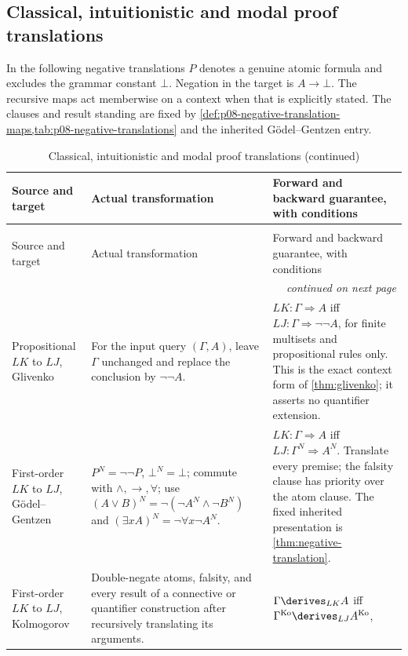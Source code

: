 \subsection{Classical, intuitionistic and modal proof translations}

In the following negative translations \(P\) denotes a genuine atomic
formula and excludes the grammar constant \(\bot\). Negation in the
target is \(A\to\bot\). The recursive maps act memberwise on a context
when that is explicitly stated. The clauses and result standing are fixed
by \cref{def:p08-negative-translation-maps,tab:p08-negative-translations}
and the inherited G\"odel--Gentzen entry.

\begin{longtable}{@{}p{}p{}p{}@{}}
\caption{Classical, intuitionistic and modal proof translations}\\
\toprule
Source and target & Actual transformation & Forward and backward guarantee, with conditions \\
\midrule
\endfirsthead
\caption[]{Classical, intuitionistic and modal proof translations (continued)}\\
\toprule
Source and target & Actual transformation & Forward and backward guarantee, with conditions \\
\midrule
\endhead
\midrule\multicolumn{3}{r}{\emph{continued on next page}}\\
\endfoot
\endlastfoot
Propositional \(LK\) to \(LJ\), Glivenko &
For the input query \((\Gamma,A)\), leave \(\Gamma\) unchanged and
replace the conclusion by \(\neg\neg A\). &
\(LK:\Gamma\Rightarrow A\) iff \(LJ:\Gamma\Rightarrow\neg\neg A\),
for finite multisets and propositional rules only. This is the exact
context form of \cref{thm:glivenko}; it asserts no quantifier extension. \\
First-order \(LK\) to \(LJ\), G\"odel--Gentzen &
\(P^N=\neg\neg P\), \(\bot^N=\bot\); commute with
\(\land,\to,\forall\); use
\((A\lor B)^N=\neg(\neg A^N\land\neg B^N)\) and
\((\exists xA)^N=\neg\forall x\neg A^N\). &
\(LK:\Gamma\Rightarrow A\) iff \(LJ:\Gamma^N\Rightarrow A^N\).
Translate every premise; the falsity clause has priority over the atom
clause. The fixed inherited presentation is \cref{thm:negative-translation}. \\
First-order \(LK\) to \(LJ\), Kolmogorov &
Double-negate atoms, falsity, and every result of a connective or
quantifier construction after recursively translating its arguments. &
\(\Gamma\derives_{LK}A\) iff
\(\Gamma^{\mathrm{Ko}}\derives_{LJ}A^{\mathrm{Ko}}\),

\end{longtable}
